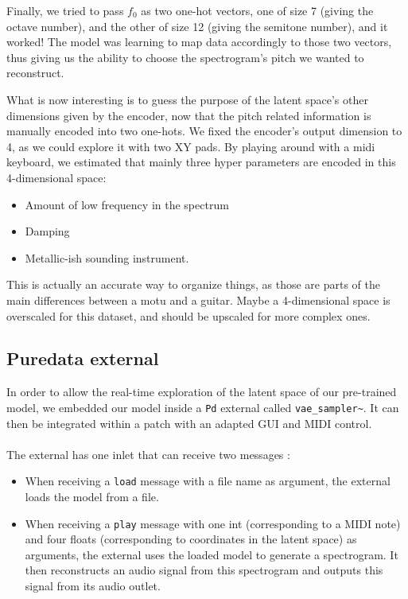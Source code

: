 \documentclass[11pt, english]{article}
\begin{document}
Finally, we tried to pass $f_0$ as two one-hot vectors, one of size 7 (giving the octave number), and the other of size 12 (giving the semitone number), and it worked! The model was learning to map data accordingly to those two vectors, thus giving us the ability to choose the spectrogram's pitch we wanted to reconstruct.\newline

What is now interesting is to guess the purpose of the latent space's other dimensions given by the encoder, now that the pitch related information is manually encoded into two one-hots. We fixed the encoder's output dimension to 4, as we could explore it with two XY pads. By playing around with a midi keyboard, we estimated that mainly three hyper parameters are encoded in this 4-dimensional space:

\begin{itemize}
    \item Amount of low frequency in the spectrum
    \item Damping
    \item Metallic-ish sounding instrument.
\end{itemize}

This is actually an accurate way to organize things, as those are parts of the main differences between a motu and a guitar. Maybe a 4-dimensional space is overscaled for this dataset, and should be upscaled for more complex ones.

\subsection{Puredata external}

In order to allow the real-time exploration of the latent space of our pre-trained model, we embedded our model inside a \texttt{Pd} external called \texttt{vae\_sampler\~}. It can then be integrated within a patch with an adapted GUI and MIDI control. 
\paragraph{}
The external has one inlet that can receive two messages : 
\begin{itemize}
\item When receiving a \texttt{load} message with a file name as argument, the external loads the model from a file. 
\item When receiving a \texttt{play} message with one int (corresponding to a MIDI note) and four floats (corresponding to coordinates in the latent space) as arguments, the external uses the loaded model to generate a spectrogram. It then reconstructs an audio signal from this spectrogram and outputs this signal from its audio outlet.  
\end{itemize}
\end{document}
